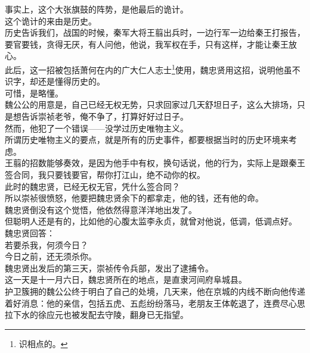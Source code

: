 \begin{multicols}{\theparacolNo}
事实上，这个大张旗鼓的阵势，是他最后的诡计。\\

这个诡计的来由是历史。\\

历史告诉我们，战国的时候，秦军大将王翦出兵时，一边行军一边给秦王打报告，要官要钱，贪得无厌，有人问他，他说，我军权在手，只有这样，才能让秦王放心。\\

此后，这一招被包括萧何在内的广大仁人志士\footnote{识相点的。}使用，魏忠贤用这招，说明他虽不识字，却还是懂得历史的。\\

可惜，是略懂。\\

魏公公的用意是，自己已经无权无势，只求回家过几天舒坦日子，这么大排场，只是想告诉崇祯老爷，俺不争了，打算好好过日子。\\

然而，他犯了一个错误——没学过历史唯物主义。\\

所谓历史唯物主义的要点，就是所有的历史事件，都要根据当时的历史环境来考虑。\\

王翦的招数能够奏效，是因为他手中有权，换句话说，他的行为，实际上是跟秦王签合同，我只要钱要官，帮你打江山，绝不动你的权。\\

此时的魏忠贤，已经无权无官，凭什么签合同？\\

所以崇祯很愤怒，他要把魏忠贤余下的都拿走，他的钱，还有他的命。\\

魏忠贤倒没有这个觉悟，他依然得意洋洋地出发了。\\

但聪明人还是有的，比如他的心腹太监李永贞，就曾对他说，低调，低调点好。\\

魏忠贤回答：\\

若要杀我，何须今日？\\

今日之前，还无须杀你。\\

魏忠贤出发后的第三天，崇祯传令兵部，发出了逮捕令。\\

这一天是十一月六日，魏忠贤所在的地点，是直隶河间府阜城县。\\

护卫簇拥的魏公公终于明白了自己的处境，几天来，他在京城的内线不断向他传递着好消息：他的亲信，包括五虎、五彪纷纷落马，老朋友王体乾退了，连费尽心思拉下水的徐应元也被发配去守陵，翻身已无指望。\\


\end{multicols}
